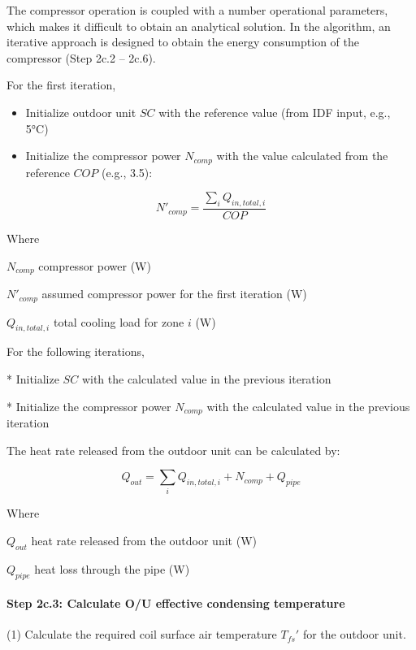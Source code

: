 The compressor operation is coupled with a number operational parameters, which makes it difficult to obtain an analytical solution. In the algorithm, an iterative approach is designed to obtain the energy consumption of the compressor (Step 2c.2 – 2c.6).

For the first iteration, 

\begin{itemize}
  \item
    Initialize outdoor unit $SC$ with the reference value (from IDF input, e.g., 5°C)
  \item
    Initialize the compressor power $N_{comp}$ with the value calculated from the reference $COP$ (e.g., 3.5):
\end{itemize}

\begin{equation}N'_{comp}=\frac{\sum_iQ_{in,total,i}}{COP}\end{equation}

Where

$N_{comp}$	compressor power (W)

$N'_{comp}$	assumed compressor power for the first iteration (W)

$Q_{in,total,i}$	total cooling load for zone $i$ (W)

For the following iterations,

* Initialize $SC$ with the calculated value in the previous iteration  

* Initialize the compressor power $N_{comp}$ with the calculated value in the previous iteration

The heat rate released from the outdoor unit can be calculated by:

\begin{equation}Q_{out}=\sum_iQ_{in,total,i}+N_{comp}+Q_{pipe}\end{equation} 

Where

$Q_{out}$	heat rate released from the outdoor unit (W)

$Q_{pipe}$ 	heat loss through the pipe (W)

\paragraph{Step 2c.3: Calculate O/U effective condensing temperature}\label{step-2c.3-calculate-ou-effective-condensing-temperature}

 (1) Calculate the required coil surface air temperature ${T_{fs}}'$ for the outdoor unit.

